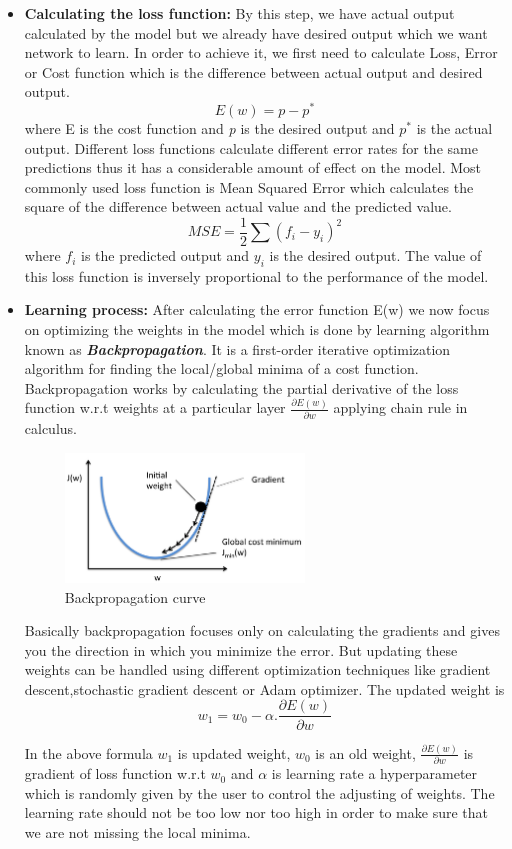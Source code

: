 \begin{itemize}
     \item \textbf{Calculating the loss function:} By this step, we have actual output calculated by the model but we already have desired output which we want network to learn. In order to achieve it, we first need to calculate Loss, Error or Cost function which is the difference between actual output and desired output.
     $$E(w)= p - p^* $$
     where E is the cost function and \textit{p} is the desired output and $p^* $ is the actual output. Different loss functions calculate different error rates for the same predictions thus it has a considerable amount of effect on the model. Most commonly used loss function is Mean Squared Error which calculates the square of the difference between actual value and the predicted value.
     $$MSE = \frac{1}{2}\sum{(f_i- y_i)^2}$$
     where $f_i$ is the predicted output and $y_i$ is the desired output. The value of this loss function is inversely proportional to the performance of the model.
     \item \textbf{Learning process:} After calculating the error function E(w) we now focus on optimizing the weights in the model which is done by learning algorithm known as \textbf{\textit{Backpropagation}}. It is a first-order iterative optimization algorithm for finding the local/global minima of a cost function. Backpropagation works by calculating the partial derivative of the loss function w.r.t weights at a particular layer $\frac{\partial E(w)}{\partial w}$ applying chain rule in calculus.%
    \begin{figure}
    \centering
    \includegraphics[width=0.6\textwidth]{thesis_template/images/backprop.png}
    \caption{Backpropagation curve}
    \label{}
    \end{figure}
     
    
    \noindent Basically backpropagation focuses only on calculating the gradients and gives you the direction in which you minimize the error. But updating these weights can be handled using different optimization techniques like gradient descent,stochastic gradient descent or Adam optimizer. The updated weight is
    $$w_1 = w_0 -  \alpha . \frac{\partial E(w)}{\partial w} $$
    
\newpage\noindent In the above formula $w_1$ is updated weight, $w_0 $ is an old weight, $\frac{\partial E(w)}{\partial w}$ is gradient of loss function w.r.t $w_0 $ and $\alpha $ is learning rate a hyperparameter which is randomly given by the user to control the adjusting of weights. The learning rate should not be too low nor too high in order to make sure that we are not missing the local minima.
     \end{itemize}
